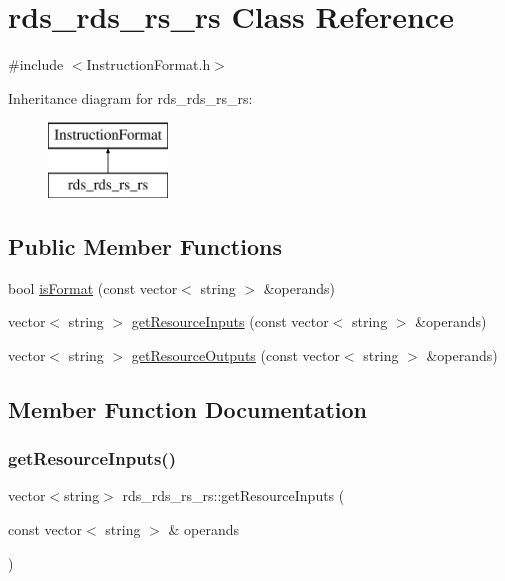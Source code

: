 \hypertarget{classrds__rds__rs__rs}{}\section{rds\+\_\+rds\+\_\+rs\+\_\+rs Class Reference}
\label{classrds__rds__rs__rs}


{\ttfamily \#include $<$Instruction\+Format.\+h$>$}

Inheritance diagram for rds\+\_\+rds\+\_\+rs\+\_\+rs\+:\begin{figure}[H]
\begin{center}
\leavevmode
\includegraphics[height=2.000000cm]{classrds__rds__rs__rs}
\end{center}
\end{figure}
\subsection*{Public Member Functions}
\begin{DoxyCompactItemize}
\item 
bool \hyperlink{classrds__rds__rs__rs_acabfdee1b6f208c2f141fdef6ba45c38}{is\+Format} (const vector$<$ string $>$ \&operands)
\item 
vector$<$ string $>$ \hyperlink{classrds__rds__rs__rs_a1e5f81778283024ee7f464bde0619a78}{get\+Resource\+Inputs} (const vector$<$ string $>$ \&operands)
\item 
vector$<$ string $>$ \hyperlink{classrds__rds__rs__rs_a1e28d72e1c55d801ca8fecdce34db4e2}{get\+Resource\+Outputs} (const vector$<$ string $>$ \&operands)
\end{DoxyCompactItemize}


\subsection{Member Function Documentation}
\mbox{\label{classrds__rds__rs__rs_a1e5f81778283024ee7f464bde0619a78}} 
\subsubsection{\texorpdfstring{get\+Resource\+Inputs()}{getResourceInputs()}}
{\footnotesize\ttfamily vector$<$string$>$ rds\+\_\+rds\+\_\+rs\+\_\+rs\+::get\+Resource\+Inputs (\begin{DoxyParamCaption}\item[{const vector$<$ string $>$ \&}]{operands }\end{DoxyParamCaption})\hspace{0.3cm}{\ttfamily [virtual]}}

